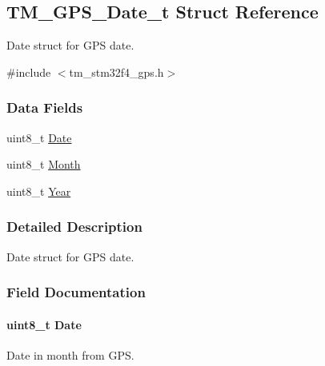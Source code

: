 \hypertarget{struct_t_m___g_p_s___date__t}{}\subsection{T\+M\+\_\+\+G\+P\+S\+\_\+\+Date\+\_\+t Struct Reference}
\label{struct_t_m___g_p_s___date__t}


Date struct for G\+P\+S date.  




{\ttfamily \#include $<$tm\+\_\+stm32f4\+\_\+gps.\+h$>$}

\subsubsection*{Data Fields}
\begin{DoxyCompactItemize}
\item 
uint8\+\_\+t \hyperlink{struct_t_m___g_p_s___date__t_a784bb90289154f1c4b6724fed7265645}{Date}
\item 
uint8\+\_\+t \hyperlink{struct_t_m___g_p_s___date__t_aee1e733c977d621eae2f655b3fd2a734}{Month}
\item 
uint8\+\_\+t \hyperlink{struct_t_m___g_p_s___date__t_ab1fa72fe40c7b93c140c766dec410e29}{Year}
\end{DoxyCompactItemize}


\subsubsection{Detailed Description}
Date struct for G\+P\+S date. 

\subsubsection{Field Documentation}
\hypertarget{struct_t_m___g_p_s___date__t_a784bb90289154f1c4b6724fed7265645}{}
\paragraph[{Date}]{\setlength{\rightskip}{0pt plus 5cm}uint8\+\_\+t Date}\label{struct_t_m___g_p_s___date__t_a784bb90289154f1c4b6724fed7265645}
Date in month from G\+P\+S. \hypertarget{struct_t_m___g_p_s___date__t_aee1e733c977d621eae2f655b3fd2a734}{}
